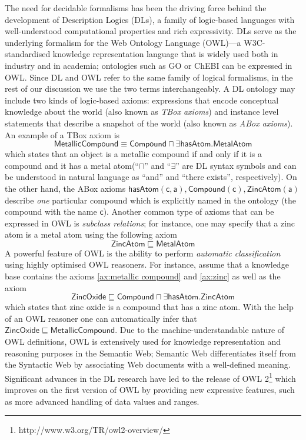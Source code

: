 \documentclass[10pt]{bmc_article}
\newenvironment{bmcformat}{\baselineskip20pt\sloppy\setboolean{publ}{false}}{\baselineskip20pt\sloppy}
\begin{document}
\begin{bmcformat}
The need for decidable formalisms has been the driving force behind the development of Description Logics (DLs), a family of logic-based languages with well-understood computational properties and rich expressivity. DLs serve as the underlying formalism for the Web Ontology Language (OWL)---a W3C-standardised  knowledge representation language that is widely used both in industry and in academia; ontologies such as GO or ChEBI can be expressed in OWL. Since DL and OWL refer to the same family of logical formalisms, in the rest of our discussion we use the two terms interchangeably.
A DL ontology may include two kinds of logic-based axioms: expressions that encode conceptual knowledge about the world (also known as \emph{TBox axioms}) and instance level statements that describe a snapshot of the world (also known as \emph{ABox axioms}). An example of a TBox axiom is \begin{equation}\label{ax:metallic compound}\mathsf{MetallicCompound} \equiv \mathsf{Compound \sqcap \exists hasAtom.MetalAtom}\end{equation} which states that an object is a metallic compound if and only if it is a compound and it has a metal atom(``$\sqcap$'' and ``$\exists$'' are DL syntax symbols and can be understood in natural language as ``and'' and ``there exists'', respectively). On the other hand, the ABox axioms $\mathsf{hasAtom(c,a),Compound(c),ZincAtom(a)}$  describe \emph{one} particular compound which is explicitly named in the ontology (the compound with the name $\mathsf{c}$). Another common type of axioms that can be expressed in OWL is \emph{subclass relations}; for instance, one  may specify that a zinc atom is a metal atom using the following axiom
 \begin{equation} \label{ax:zinc}\mathsf{ZincAtom} \sqsubseteq \mathsf{MetalAtom}\end{equation} 
 A powerful feature of OWL is the ability to perform \emph{automatic classification} using highly optimised OWL reasoners. For instance, assume that a knowledge base contains the axioms \eqref{ax:metallic compound} and \eqref{ax:zinc} as well as the axiom \begin{equation}\mathsf{ZincOxide} \sqsubseteq \mathsf{Compound \sqcap \exists hasAtom.ZincAtom}\end{equation} which states that zinc oxide is a compound that has a zinc atom. With the help of an OWL reasoner one can automatically infer that $\mathsf{ZincOxide} \sqsubseteq \mathsf{MetallicCompound}$.
Due to the machine-understandable nature of OWL definitions, OWL is extensively used for knowledge representation and reasoning purposes in the Semantic Web; Semantic Web differentiates itself from the Syntactic Web by associating Web documents with a well-defined meaning. Significant advances in the DL research have led to the release of OWL 2\footnote{http://www.w3.org/TR/owl2-overview/} which improves on the first version of OWL by providing new expressive features, such as more advanced handling of data values and ranges.


\end{bmcformat}
\end{document}
